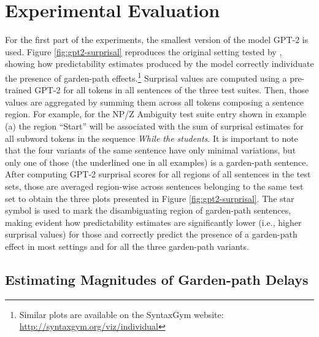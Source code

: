 \documentclass[a4paper, nobind]{templates/ociamthesis}
\begin{document}
\hypertarget{subchap:ex3-experiments}{%
\section{Experimental Evaluation}\label{subchap:ex3-experiments}}

For the first part of the experiments, the smallest version of the model GPT-2 is used. Figure \ref{fig:gpt2-surprisal} reproduces the original setting tested by \textcite{hu-etal-2020-systematic}, showing how predictability estimates produced by the model correctly individuate the presence of garden-path effects.\footnote{Similar plots are available on the SyntaxGym website: \url{http://syntaxgym.org/viz/individual}} Surprisal values are computed using a pre-trained GPT-2 for all tokens in all sentences of the three test suites. Then, those values are aggregated by summing them across all tokens composing a sentence region. For example, for the NP/Z Ambiguity test suite entry shown in example (a) the region ``Start'' will be associated with the sum of surprisal estimates for all subword tokens in the sequence \emph{While the students}. It is important to note that the four variants of the same sentence have only minimal variations, but only one of those (the underlined one in all examples) is a garden-path sentence. After computing GPT-2 surprisal scores for all regions of all sentences in the test sets, those are averaged region-wise across sentences belonging to the same test set to obtain the three plots presented in Figure \ref{fig:gpt2-surprisal}. The star symbol is used to mark the disambiguating region of garden-path sentences, making evident how predictability estimates are significantly lower (i.e., higher surprisal values) for those and correctly predict the presence of a garden-path effect in most settings and for all the three garden-path variants.

\hypertarget{subsubchap:ex3-magnitudes}{%
\subsection{Estimating Magnitudes of Garden-path Delays}\label{subsubchap:ex3-magnitudes}}
\end{document}

